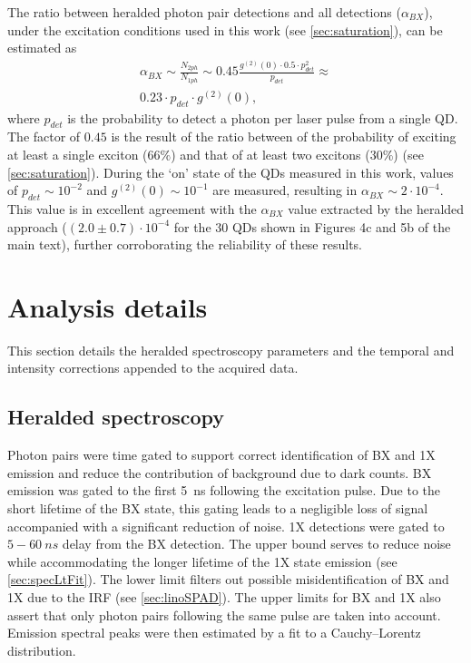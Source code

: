 \documentclass[journal=nalefd, manuscript=letter, layout=twocolumn]{achemso}
\begin{document}
The ratio between heralded photon pair detections and all detections ($\alpha_{BX}$), under the excitation conditions used in this work (see \autoref{sec:saturation}), can be estimated as
\begin{multline}
    \alpha_{BX} \sim
    \frac{N_{2ph}}{N_{1ph}} \sim
    0.45\frac{g^{(2)}(0) \cdot 0.5 \cdot p_{det}^2}{p_{det}} \approx \\ 0.23 \cdot p_{det}\cdot g^{(2)}(0), 
\end{multline}
where $p_{det}$ is the probability to detect a photon per laser pulse from a single QD. The factor of $0.45$ is the result of the ratio between of the probability of exciting at least a single exciton ($66\%$) and that of at least two excitons ($30\%$) (see \autoref{sec:saturation}). During the `on' state of the QDs measured in this work, values of $p_{det} \sim 10^{-2}$ and $g^{(2)}(0)\sim 10^{-1}$ are measured, resulting in  $\alpha_{BX}\sim 2\cdot 10^{-4}$. This value is in excellent agreement with the $\alpha_{BX}$ value extracted by the heralded approach ($(2.0\pm0.7) \cdot 10^{-4}$ for the 30 QDs shown in Figures 4c and 5b of the main text), further corroborating the reliability of these results.

\section{Analysis details}\label{sec:analysis} 
This section details the heralded spectroscopy parameters and the temporal and intensity corrections appended to the acquired data.

\subsection{Heralded spectroscopy} Photon pairs were time gated to support correct identification of BX and 1X emission and reduce the contribution of background due to dark counts. BX emission was gated to the first \SI{5}{ns} following the excitation pulse. Due to the short lifetime of the BX state, this gating leads to a negligible loss of signal accompanied with a significant reduction of noise. 1X detections were gated to $5-\SI{60}{ns}$ delay from the BX detection. The upper bound serves to reduce noise while accommodating the longer lifetime of the 1X state emission (see \autoref{sec:specLtFit}). The lower limit filters out possible misidentification of BX and 1X due to the IRF (see \autoref{sec:linoSPAD}). The upper limits for BX and 1X also assert that only photon pairs following the same pulse are taken into account. Emission spectral peaks were then estimated by a fit to a Cauchy–Lorentz distribution.
\end{document}
